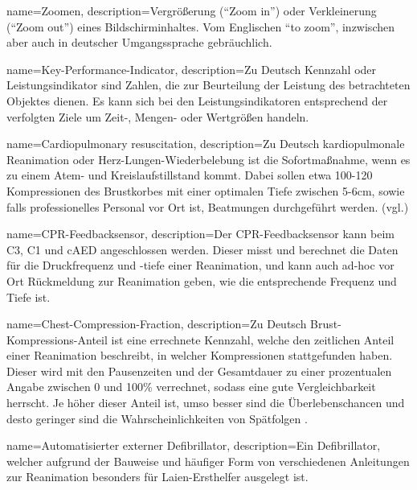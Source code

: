 

{
     name=Zoomen,
     description={Vergrößerung ("`Zoom in"') oder Verkleinerung ("`Zoom out"') eines Bildschirminhaltes. Vom Englischen "`to zoom"', inzwischen aber auch in deutscher Umgangssprache gebräuchlich.}
}

{
     name=Key-Performance-Indicator,
     description={Zu Deutsch Kennzahl oder Leistungsindikator sind \glqq Zahlen, die zur Beurteilung der Leistung des betrachteten Objektes dienen. Es kann sich bei den Leistungsindikatoren entsprechend der verfolgten Ziele um Zeit-, Mengen- oder Wertgrößen handeln.\grqq{}  \cite[S. 342, S. 3f]{Friedl.2003, Maute.2009} }
}

{
     name=Cardiopulmonary resuscitation,
     description={Zu Deutsch kardiopulmonale Reanimation oder Herz-Lungen-Wiederbelebung ist die Sofortmaßnahme, wenn es zu einem Atem- und Kreislaufstillstand kommt. Dabei sollen etwa 100-120 Kompressionen des Brustkorbes mit einer optimalen Tiefe zwischen 5-6cm, sowie falls professionelles Personal vor Ort ist, Beatmungen durchgeführt werden. (vgl.\cite{Nolan.2010, Monsieurs.2015}) }
}

{
     name=CPR-Feedbacksensor,
     description={Der CPR-Feedbacksensor kann beim \acrlong{C3}, \acrlong{C1} und \acrlong{cAED} angeschlossen werden. Dieser misst und berechnet die Daten für die Druckfrequenz und -tiefe einer Reanimation, und kann auch ad-hoc vor Ort Rückmeldung zur Reanimation geben, wie die entsprechende Frequenz und Tiefe ist.}
}

{
     name=Chest-Compression-Fraction,
     description={Zu Deutsch Brust-Kompressions-Anteil ist eine errechnete  Kennzahl, welche den zeitlichen Anteil einer Reanimation beschreibt, in welcher Kompressionen stattgefunden haben. Dieser wird mit den Pausenzeiten und der Gesamtdauer zu einer prozentualen Angabe zwischen 0 und 100\% verrechnet, sodass eine gute Vergleichbarkeit herrscht. Je höher dieser Anteil ist, umso besser sind die Überlebenschancen und desto geringer sind die Wahrscheinlichkeiten von Spätfolgen \cite{Christenson.2009}. }
}

{
     name=Automatisierter externer Defibrillator,
     description={Ein Defibrillator, welcher aufgrund der Bauweise und häufiger Form von verschiedenen Anleitungen zur Reanimation besonders für Laien-Ersthelfer ausgelegt ist.}
}

